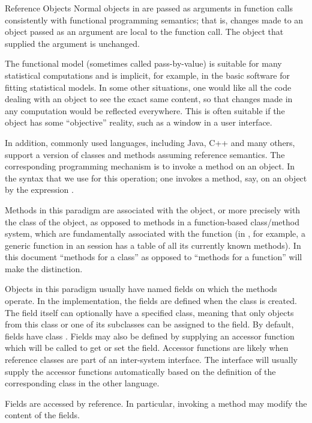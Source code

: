 \begin{Section}{Reference Objects}
Normal objects in \R{} are passed as arguments in function calls consistently with
functional programming semantics; that is, changes made to an object
passed as an argument are local to the function call.  The object that
supplied the argument is unchanged.

The functional model (sometimes called pass-by-value) is
suitable for many statistical computations and is implicit, for
example, in the basic \R{} software for fitting statistical models.
In some other situations, one would like all the code dealing with an
object to see the exact same content, so that changes made in any
computation would be reflected everywhere.
This is often suitable if the object has some ``objective''
reality, such as a window in a user interface.

In addition, commonly used languages, including Java, C++ and many
others, support a version of classes and methods assuming reference
semantics.
The corresponding programming mechanism
is to invoke a method on an object.
In the \R{} syntax that we use  
for this operation; one invokes a method,
 say, on an object  by the expression
. 

Methods in this paradigm are associated with the object, or more
precisely with the class of the object, as opposed to methods in a
function-based class/method system, which are fundamentally associated
with the function (in \R{}, for example, a generic function in an \R{}
session has a table of all its currently known methods).
In this document ``methods for a class'' as opposed to
``methods for a function'' will make the distinction.

Objects in this paradigm usually have named fields on which
the methods operate.
In the \R{} implementation, the fields are defined when the class is
created.
The field itself can optionally have a specified class, meaning that only objects
from this class or one of its subclasses can be assigned to the field.
By default, fields have class .
Fields may also be defined by supplying an accessor function which
will be called to get or set the field.
Accessor functions are likely when reference classes are part of an
inter-system interface.
The interface will usually supply the accessor functions automatically
based on the definition of the corresponding class in the other language.

Fields are accessed by reference.
In particular, invoking a method may modify the content of
the fields.


\end{Section}
